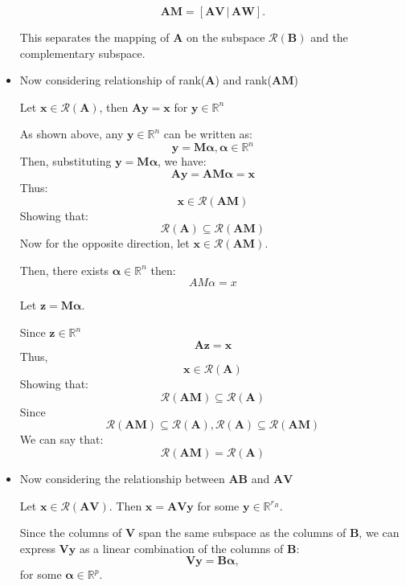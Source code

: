 \documentclass[12pt]{article}
\newcommand{\bmat}[1]{\mathbf{#1}} %
\begin{document}
\begin{itemize}
\[
\mathbf{A}\mathbf{M} = [\mathbf{A}\mathbf{V} \, | \, \mathbf{A}\mathbf{W}].
\]

This separates the mapping of \( \mathbf{A} \) on the subspace \( \mathcal{R}(\mathbf{B}) \) and the complementary subspace.
\vspace{\baselineskip}


 \item Now considering relationship of rank($\bmat{A}$) and rank($\bmat{AM}$)




Let $\bmat{x} \in \mathcal{R}(\bmat{A})$, then $\bmat{Ay}= \bmat{x}$ for $\bmat{y} \in \mathbb{R}^n$

As shown above, any \( \mathbf{y} \in \mathbb{R}^n \) can be written as:
\[
\mathbf{y} = \mathbf{M} \boldsymbol{\alpha}, \boldsymbol{\alpha} \in \mathbb{R}^n
\]
Then, substituting \( \bmat{y} = \bmat{M}\boldsymbol{\alpha} \), we have: 
\[
\bmat{Ay} = \bmat{AM}\boldsymbol{\alpha} = \bmat{x} 
\]
Thus:
\[\bmat{x} \in \mathcal{R}(\bmat{AM}) \]
Showing that:
\[\mathcal{R}(\bmat{A}) \subseteq \mathcal{R}(\bmat{AM}) \]
Now for the opposite direction, let \( \bmat{x} \in \mathcal{R}(\bmat{AM}) \).

Then, there exists \( \boldsymbol{\alpha} \in \mathbb{R}^n \) then:
\[AM\alpha = x \]

Let \( \bmat{z} = \bmat{M}\boldsymbol{\alpha} \). 

Since \( \bmat{z} \in \mathbb{R}^n \)
\[\bmat{Az} = \bmat{x} \]
Thus, \[\bmat{x} \in \mathcal{R}(\bmat{A}) \]
Showing that:
\[\mathcal{R}(\bmat{AM}) \subseteq \mathcal{R}(\bmat{A}) \]
Since 
\[
\mathcal{R}(\bmat{AM}) \subseteq \mathcal{R}(\bmat{A}) , \mathcal{R}(\bmat{A}) \subseteq \mathcal{R}(\bmat{AM}) 
\]
We can say that:
\[
\mathcal{R}(\bmat{AM}) = \mathcal{R}(\bmat{A}) 
\]
\vspace{\baselineskip}

\item Now considering the relationship between $\bmat{AB}$ and $\bmat{AV}$

 
Let \( \mathbf{x} \in \mathcal{R}(\mathbf{AV}) \). Then \( \mathbf{x} = \mathbf{A}\mathbf{V}\mathbf{y} \) for some \( \mathbf{y} \in \mathbb{R}^{r_B} \).

Since the columns of \( \mathbf{V} \) span the same subspace as the columns of \( \mathbf{B} \), we can express \( \mathbf{V}\mathbf{y} \) as a linear combination of the columns of \( \mathbf{B} \):
  \[
  \mathbf{V}\mathbf{y} = \mathbf{B}\boldsymbol{\alpha},
  \]
  for some \( \boldsymbol{\alpha} \in \mathbb{R}^p \).


\end{itemize}
\end{document}
